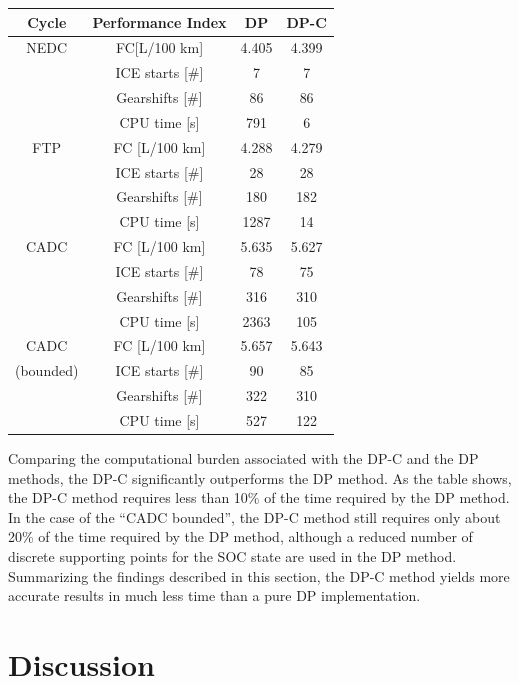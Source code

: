 \documentclass[conference]{IEEEtran}
\begin{document}
\begin{center}
\begin{tabular}{ c c c c }  
\hline
\textbf{Cycle} & \textbf{Performance Index} & \textbf{DP} & \textbf{DP-C} \\
\hline
NEDC & FC[L/100 km]  & 4.405 & 4.399 \\
  & ICE starts [\#] & 7 & 7 \\
 & Gearshifts [\#] & 86 & 86 \\
&CPU time [s] & 791 & 6 \\
\hline
FTP &FC [L/100 km] &4.288 &4.279\\ 
&ICE starts [\#] &28 &28 \\
&Gearshifts [\#] &180 &182 \\
&CPU time [s]& 1287 &14 \\
\hline
CADC &FC [L/100 km] &5.635 &5.627 \\
&ICE starts [\#] &78 &75 \\
&Gearshifts [\#] &316 &310 \\
&CPU time [s] &2363 &105 \\
\hline
CADC &FC [L/100 km] &5.657 &5.643\\ 
(bounded) &ICE starts [\#] &90 &85 \\
&Gearshifts [\#] &322 &310 \\
&CPU time [s]  &527 &122 \\

\hline
\end{tabular}
\end{center}

Comparing the computational burden associated with the DP-C and the DP methods, the DP-C significantly outperforms the DP method. As the table shows, the DP-C method requires less than 10\% of the time required by the DP method. In the case of the “CADC bounded”, the DP-C method still requires only about 20\% of the time required by the DP method, although a reduced number of discrete supporting points for the SOC state are used in the DP method. \\

Summarizing the findings described in this section, the DP-C method yields more accurate results in much less time than a pure DP implementation.

\section{\textbf{Discussion}}
\end{document}
